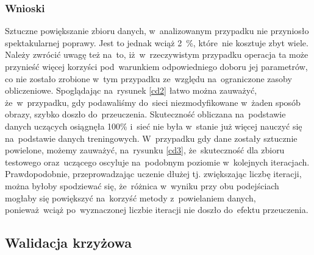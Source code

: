 \subsubsection{Wnioski}
Sztuczne powiększanie zbioru danych, w~analizowanym przypadku nie przyniosło spektakularnej poprawy. Jest to jednak wciąż 2~\%, które~nie kosztuje zbyt wiele. Należy zwrócić uwagę też na~to, iż~w~rzeczywistym przypadku operacja ta może przynieść więcej korzyści pod~warunkiem odpowiedniego doboru jej parametrów, co nie zostało zrobione w~tym przypadku ze~względu na~ograniczone zasoby obliczeniowe. Spoglądając na~rysunek \ref{cd2} łatwo można zauważyć, że~w~przypadku, gdy podawaliśmy do~sieci niezmodyfikowane w~żaden sposób obrazy, szybko doszło do~przeuczenia. Skuteczność obliczana na~podstawie danych uczących osiągnęła 100\% i~sieć nie była w~stanie już więcej nauczyć się na~podstawie danych treningowych. W~przypadku gdy dane zostały sztucznie powielone, możemy zauważyć, na~rysunku \ref{cd3}, że~skuteczność dla zbioru testowego oraz~uczącego oscyluje na~podobnym poziomie w~kolejnych iteracjach. Prawdopodobnie, przeprowadzając uczenie dłużej tj. zwiększając liczbę iteracji, można byłoby spodziewać się, że~różnica w~wyniku przy obu podejściach mogłaby się powiększyć na~korzyść metody z~powielaniem danych, ponieważ~wciąż po~wyznaczonej liczbie iteracji nie doszło do~efektu przeuczenia.

\subsection{Walidacja krzyżowa}\label{cvChapter}
